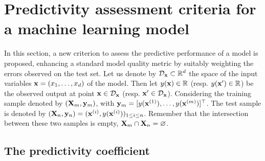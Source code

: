 \section{Predictivity assessment criteria for a machine learning model}\label{sec:q2}
In this section, a new criterion to assess the predictive performance of a model is proposed, enhancing a standard model quality metric by suitably weighting the errors observed on the test set. 
Let us denote by $\mathcal{D}_{\bf x} \subset \mathbb{R}^d$ the space of the input variables ${\bf x}=(x_1,\ldots,x_d)$ of the model. 
Then let $y({\bf x}) \in \mathbb{R}$ (resp. $y({\bf x}') \in \mathbb{R}$) be the observed output at point ${\bf x} \in \mathcal{D}_{\bf x}$ (resp. ${\bf x}' \in \mathcal{D}_{\bf x}$). 
Considering the training sample denoted by $({\bf X}_m,{\bf y}_m)$, with ${\bf y}_m = [y({\bf x}^{(1)}),\ldots,y({\bf x}^{(m)})]^\top$. 
The test sample is denoted by $({\bf X}_n,{\bf y}_n) = ({\bf x}^{(i)},y({\bf x}^{(i)}))_{1\leq i \leq n}$. 
Remember that the intersection between these two samples is empty, ${\bf X}_m \cap {\bf X}_n = \varnothing$.


\subsection{The predictivity coefficient}


